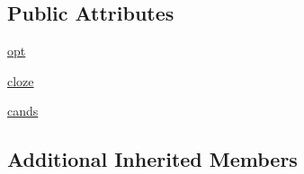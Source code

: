 \subsection*{Public Attributes}
\begin{DoxyCompactItemize}
\item 
\hyperlink{classparlai_1_1core_1_1teachers_1_1FbDialogTeacher_af7a9ec497b9cd0292d7b8fa220da7c28}{opt}
\item 
\hyperlink{classparlai_1_1core_1_1teachers_1_1FbDialogTeacher_a8505bfe962961b04961280a6e4c603f4}{cloze}
\item 
\hyperlink{classparlai_1_1core_1_1teachers_1_1FbDialogTeacher_a3ec67545250d8a877038667e3f4ea158}{cands}
\end{DoxyCompactItemize}
\subsection*{Additional Inherited Members}


